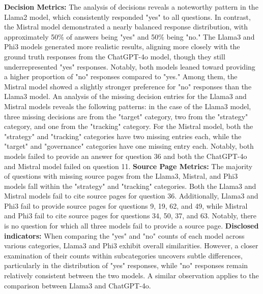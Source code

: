 \documentclass[]{article}
\begin{document}
\textbf{Decision Metrics:} The analysis of decisions reveals a noteworthy pattern in the Llama2 model, 
which consistently responded "yes" to all questions. 
In contrast, the Mistral model demonstrated a nearly balanced response distribution, 
with approximately 50$\%$ of answers being "yes" and 50$\%$ being "no." 
The Llama3 and Phi3 models generated more realistic results, 
aligning more closely with the ground truth responses from the ChatGPT-4o model,
though they still underrepresented "yes" responses. 
Notably, both models leaned toward providing a higher proportion of "no" responses compared to "yes." 
Among them, the Mistral model showed a slightly stronger preference for "no" responses than the Llama3 model.
\newline\newline
An analysis of the missing decision entries for the Llama3 and Mistral models reveals the following patterns: 
in the case of the Llama3 model, three missing decisions are from the "target" category, 
two from the "strategy" category, and one from the "tracking" category. \newline
For the Mistral model, both the "strategy" and "tracking" categories have two missing entries each,
while the "target" and "governance" categories have one missing entry each. Notably, 
both models failed to provide an answer for question 36 and both the ChatGPT-4o and Mistral model failed on question 11.
\newline\newline
\textbf{Source Page Metrics:} The majority of questions with missing source pages from the Llama3, Mistral, and Phi3 models 
fall within the "strategy" and "tracking" categories. 
Both the Llama3 and Mistral models fail to cite source pages for question 36. 
Additionally, Llama3 and Phi3 fail to provide source pages for questions 9, 19, 62, and 49, 
while Mistral and Phi3 fail to cite source pages for questions 34, 50, 37, and 63. Notably, 
there is no question for which all three models fail to provide a source page.
\newline\newline
\textbf{Disclosed indicators:} 
When comparing the "yes" and "no" counts of each model across various categories, 
Llama3 and Phi3 exhibit overall similarities. However, 
a closer examination of their counts within subcategories uncovers subtle differences, 
particularly in the distribution of "yes" responses, while "no" responses remain relatively 
consistent between the two models. A similar observation applies to the comparison between Llama3 and ChatGPT-4o.
\newline\newline
\end{document}

